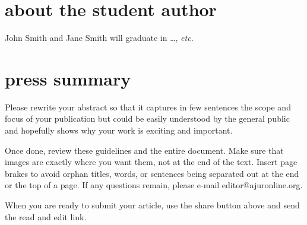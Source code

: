 \documentclass[10pt]{article}
\begin{document}
\section*{about the student author}
John Smith and Jane Smith will graduate in \ldots, \textit{etc.}

\section*{press summary}

Please rewrite your abstract so that it captures in few sentences the scope and focus of your publication but could be easily understood by the general public and hopefully shows why your work is exciting and important.

Once done, review these guidelines and the entire document. Make sure that images are exactly where you want them, not at the end of the text. Insert page brakes to avoid orphan titles, words, or sentences being separated out at the end or the top of a page. If any questions remain, please e-mail editor@ajuronline.org.

When you are ready to submit your article, use the share button above and send the read and edit  link.
\end{document}
